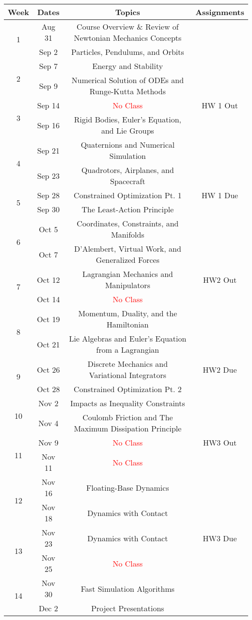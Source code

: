 \documentclass[11pt,letterpaper]{article}
\begin{document}
\begin{tabular}{c|c|c|c}
	Week & Dates & Topics & Assignments \\
	\hline
	\multirow{2}{*}{1} & Aug 31 & Course Overview \& Review of Newtonian Mechanics Concepts \\
	 & Sep 2 & Particles, Pendulums, and Orbits &  \\
	\hline
	\multirow{2}{*}{2} & Sep 7 & Energy and Stability &  \\
	 & Sep 9 & Numerical Solution of ODEs and Runge-Kutta Methods &  \\
	\hline
	\multirow{2}{*}{3} & Sep 14 &  \textcolor{red}{No Class} & HW 1 Out \\
	 & Sep 16 & Rigid Bodies, Euler's Equation, and Lie Groups &  \\
	\hline
	\multirow{2}{*}{4} & Sep 21 & Quaternions and Numerical Simulation &  \\
	 & Sep 23 & Quadrotors, Airplanes, and Spacecraft & \\
	\hline
	\multirow{2}{*}{5} & Sep 28 & Constrained Optimization Pt. 1 & HW 1 Due \\
	 & Sep 30 & The Least-Action Principle & \\
	\hline
	\multirow{2}{*}{6}  & Oct 5 & Coordinates, Constraints, and Manifolds &  \\
	 & Oct 7 & D'Alembert, Virtual Work, and Generalized Forces & \\
	\hline
	\multirow{2}{*}{7}  & Oct 12 & Lagrangian Mechanics and Manipulators & HW2 Out \\
	 & Oct 14 & \textcolor{red}{No Class} &  \\
	\hline
	\multirow{2}{*}{8}  & Oct 19 & Momentum, Duality, and the Hamiltonian & \\
	 & Oct 21 & Lie Algebras and Euler's Equation from a Lagrangian & \\
	\hline
	\multirow{2}{*}{9}  & Oct 26 & Discrete Mechanics and Variational Integrators & HW2 Due \\
	 & Oct 28 & Constrained Optimization Pt. 2 &   \\
	\hline
	\multirow{2}{*}{10}  & Nov 2 & Impacts as Inequality Constraints &  \\
	 & Nov 4 & Coulomb Friction and The Maximum Dissipation Principle & \\
	 \hline
	\multirow{2}{*}{11}  & Nov 9 & \textcolor{red}{No Class} & HW3 Out \\
	 & Nov 11 & \textcolor{red}{No Class} &   \\
	 \hline
	\multirow{2}{*}{12}  & Nov 16 & Floating-Base Dynamics &  \\
	 & Nov 18 & Dynamics with Contact &   \\
	 \hline
	\multirow{2}{*}{13}  & Nov 23 & Dynamics with Contact & HW3 Due \\
	 & Nov 25 & \textcolor{red}{No Class} & \\
	 \hline
	\multirow{2}{*}{14}  & Nov 30 & Fast Simulation Algorithms &  \\
	 & Dec 2 & Project Presentations &   \\
\end{tabular}
\end{document}
